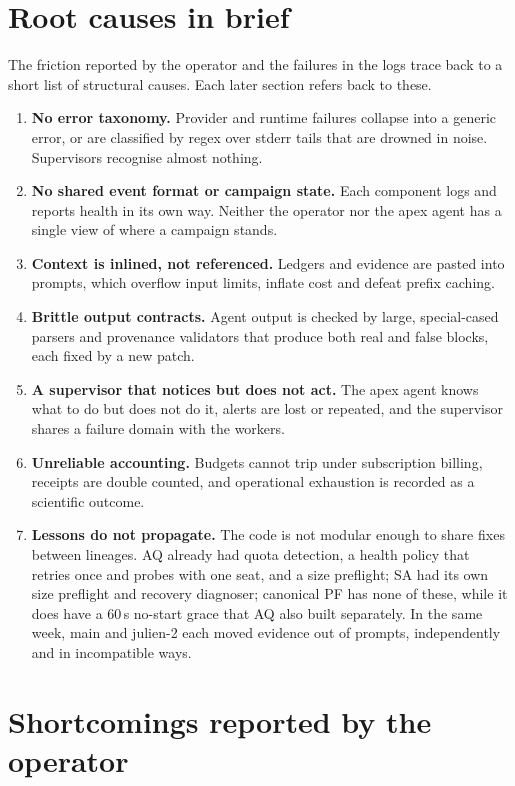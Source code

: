 \documentclass[11pt,a4paper]{article}
\begin{document}
\section{Root causes in brief}

The friction reported by the operator and the failures in the logs trace back
to a short list of structural causes. Each later section refers back to these.

\begin{enumerate}[label=\textbf{R\arabic*}]
\item \textbf{No error taxonomy.} Provider and runtime failures collapse into a
  generic error, or are classified by regex over stderr tails that are drowned in
  noise. Supervisors recognise almost nothing.
\item \textbf{No shared event format or campaign state.} Each component logs and
  reports health in its own way. Neither the operator nor the apex agent has a
  single view of where a campaign stands.
\item \textbf{Context is inlined, not referenced.} Ledgers and evidence are pasted
  into prompts, which overflow input limits, inflate cost and defeat prefix
  caching.
\item \textbf{Brittle output contracts.} Agent output is checked by large,
  special-cased parsers and provenance validators that produce both real and
  false blocks, each fixed by a new patch.
\item \textbf{A supervisor that notices but does not act.} The apex agent knows
  what to do but does not do it, alerts are lost or repeated, and the supervisor
  shares a failure domain with the workers.
\item \textbf{Unreliable accounting.} Budgets cannot trip under subscription
  billing, receipts are double counted, and operational exhaustion is recorded as
  a scientific outcome.
\item \textbf{Lessons do not propagate.} The code is not modular enough to share
  fixes between lineages. AQ already had quota detection, a health policy that
  retries once and probes with one seat, and a size preflight; SA had its own size
  preflight and recovery diagnoser; canonical PF has none of these, while it does
  have a 60\,s no-start grace that AQ also built separately. In the same week, main and julien-2 each moved
  evidence out of prompts, independently and in incompatible ways.
\end{enumerate}

\section{Shortcomings reported by the operator}
\end{document}
